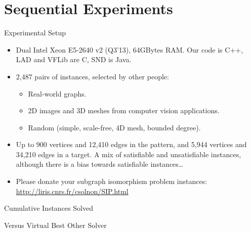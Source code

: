 \documentclass{beamer}
\begin{document}
\section{Sequential Experiments}

\begin{frame}{Experimental Setup}
    \begin{itemize}
        \item Dual Intel Xeon E5-2640 v2 (Q3'13), 64GBytes RAM. Our code is C++, LAD and VFLib are C, SND is Java.

        \item 2,487 pairs of instances, selected by other people:
            \begin{itemize}
                \item Real-world graphs.
                \item 2D images and 3D meshes from computer vision applications.
                \item Random (simple, scale-free, 4D mesh, bounded degree).
            \end{itemize}

        \item Up to 900 vertices and 12,410 edges in the pattern, and 5,944 vertices and 34,210
            edges in a target. A mix of satisfiable and unsatisfiable instances, although there is a
            bias towards satisfiable instances\ldots

        \item Please donate your subgraph isomorphism problem instances: \\
            \centering \url{http://liris.cnrs.fr/csolnon/SIP.html}
    \end{itemize}
\end{frame}

\begin{frame}[t,plain]{Cumulative Instances Solved}
    \only<1>{
        
    }
    \only<2>{
        
    }
\end{frame}

\begin{frame}[t,plain]{Versus Virtual Best Other Solver}
    \only<1>{
        
    }
\end{frame}
\end{document}
